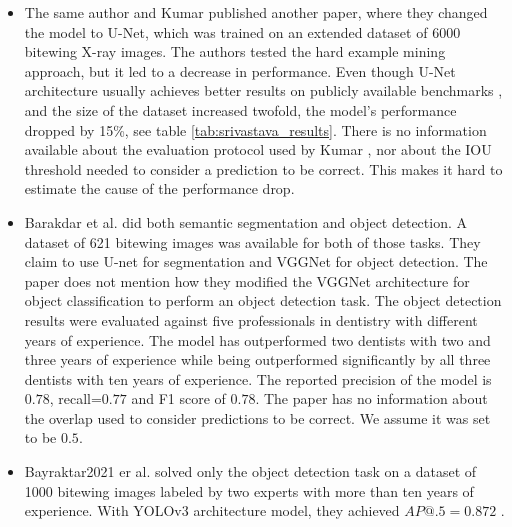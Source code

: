\begin{itemize}
    \item{The same author and Kumar \cite{Kumar2018}} published another paper, where they changed the model to U-Net, which was trained on an extended dataset of 6000 bitewing X-ray images. The authors tested the hard example mining approach, but it led to a decrease in performance. Even though U-Net architecture usually achieves better results on publicly available benchmarks \cite{paperwithcode, Zhang2019}, and the size of the dataset increased twofold, the model's performance dropped by 15\%, see table \ref{tab:srivastava_results}. There is no information available about the evaluation protocol used by Kumar \cite{Kumar2018}, nor about the IOU threshold needed to consider a prediction to be correct. This makes it hard to estimate the cause of the performance drop.
    \item{Barakdar et al. \cite{Bayrakdar2021}} did both semantic segmentation and object detection. A dataset of 621 bitewing images was available for both of those tasks. They claim to use U-net for segmentation and VGGNet for object detection. The paper does not mention how they modified the VGGNet architecture for object classification to perform an object detection task. The object detection results were evaluated against five professionals in dentistry with different years of experience. The model has outperformed two dentists with two and three years of experience while being outperformed significantly by all three dentists with ten years of experience. The reported precision of the model is $0.78$, recall=$0.77$ and F1 score of $0.78$. The paper has no information about the overlap used to consider predictions to be correct. We assume it was set to be $0.5$.
    \item{Bayraktar2021 er al. \cite{Bayraktar2021}} solved only the object detection task on a dataset of 1000 bitewing images labeled by two experts with more than ten years of experience. With YOLOv3 architecture model, they achieved $AP@.5 = 0.872$ .
\end{itemize}

